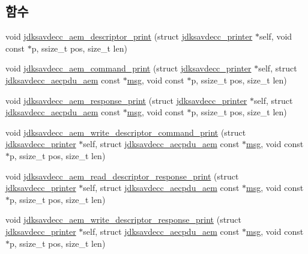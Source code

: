 \subsection*{함수}
\begin{DoxyCompactItemize}
\item 
void \hyperlink{group__aem__print_gadd626df0712b38901c31f452c182ee82}{jdksavdecc\+\_\+aem\+\_\+descriptor\+\_\+print} (struct \hyperlink{structjdksavdecc__printer}{jdksavdecc\+\_\+printer} $\ast$self, void const $\ast$p, ssize\+\_\+t pos, size\+\_\+t len)
\item 
void \hyperlink{group__aem__print_gae1e2e8e45252cd16a6f95d590870a6ea}{jdksavdecc\+\_\+aem\+\_\+command\+\_\+print} (struct \hyperlink{structjdksavdecc__printer}{jdksavdecc\+\_\+printer} $\ast$self, struct \hyperlink{structjdksavdecc__aecpdu__aem}{jdksavdecc\+\_\+aecpdu\+\_\+aem} const $\ast$\hyperlink{openavb__log_8c_a0c7e58a50354c4a4d6dad428d0e47029}{msg}, void const $\ast$p, ssize\+\_\+t pos, size\+\_\+t len)
\item 
void \hyperlink{group__aem__print_ga080525f389502f5863a67b3ac0879685}{jdksavdecc\+\_\+aem\+\_\+response\+\_\+print} (struct \hyperlink{structjdksavdecc__printer}{jdksavdecc\+\_\+printer} $\ast$self, struct \hyperlink{structjdksavdecc__aecpdu__aem}{jdksavdecc\+\_\+aecpdu\+\_\+aem} const $\ast$\hyperlink{openavb__log_8c_a0c7e58a50354c4a4d6dad428d0e47029}{msg}, void const $\ast$p, ssize\+\_\+t pos, size\+\_\+t len)
\item 
void \hyperlink{group__aem__print_ga78e8636bf3ea484ced964b964000076d}{jdksavdecc\+\_\+aem\+\_\+write\+\_\+descriptor\+\_\+command\+\_\+print} (struct \hyperlink{structjdksavdecc__printer}{jdksavdecc\+\_\+printer} $\ast$self, struct \hyperlink{structjdksavdecc__aecpdu__aem}{jdksavdecc\+\_\+aecpdu\+\_\+aem} const $\ast$\hyperlink{openavb__log_8c_a0c7e58a50354c4a4d6dad428d0e47029}{msg}, void const $\ast$p, ssize\+\_\+t pos, size\+\_\+t len)
\item 
void \hyperlink{group__aem__print_gaa565b25028b932889c102445b2ae7c52}{jdksavdecc\+\_\+aem\+\_\+read\+\_\+descriptor\+\_\+response\+\_\+print} (struct \hyperlink{structjdksavdecc__printer}{jdksavdecc\+\_\+printer} $\ast$self, struct \hyperlink{structjdksavdecc__aecpdu__aem}{jdksavdecc\+\_\+aecpdu\+\_\+aem} const $\ast$\hyperlink{openavb__log_8c_a0c7e58a50354c4a4d6dad428d0e47029}{msg}, void const $\ast$p, ssize\+\_\+t pos, size\+\_\+t len)
\item 
void \hyperlink{group__aem__print_ga84cff27ea7c23f1d9fdc1e953c023a80}{jdksavdecc\+\_\+aem\+\_\+write\+\_\+descriptor\+\_\+response\+\_\+print} (struct \hyperlink{structjdksavdecc__printer}{jdksavdecc\+\_\+printer} $\ast$self, struct \hyperlink{structjdksavdecc__aecpdu__aem}{jdksavdecc\+\_\+aecpdu\+\_\+aem} const $\ast$\hyperlink{openavb__log_8c_a0c7e58a50354c4a4d6dad428d0e47029}{msg}, void const $\ast$p, ssize\+\_\+t pos, size\+\_\+t len)

\end{DoxyCompactItemize}
